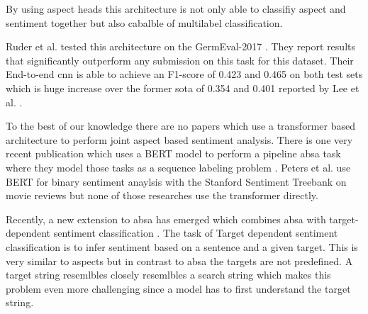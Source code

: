 By using aspect heads this architecture is not only able to classifiy aspect and sentiment together but also cabalble of multilabel classification.

Ruder et al. tested this architecture on the GermEval-2017 \cite{Wojatzki2017}. They report results that significantly outperform any submission on this task for this dataset. Their End-to-end \gls{cnn} is able to achieve an F1-score of 0.423 and 0.465 on both test sets which is huge increase over the former \acrfull{sota} of 0.354 and 0.401 reported by Lee et al. \cite{Lee2017}.
\medskip

To the best of our knowledge there are no papers which use a transformer based architecture to perform joint aspect based sentiment analysis. There is one very recent publication which uses a BERT \cite{Devlin2018} model to perform a pipeline \gls{absa} task where they model those tasks as a sequence labeling problem \cite{Xu2019}. Peters et al. use BERT for binary sentiment anaylsis with the Stanford Sentiment Treebank \cite{Socher2013} on movie reviews \cite{Peters2019} but none of those researches use the transformer directly.
\medskip

Recently, a new extension to \gls{absa} has emerged which combines \gls{absa} with target-dependent sentiment classification \cite{Tang2016}. The task of Target dependent sentiment classification is to infer sentiment based on a sentence and a given target. This is very similar to aspects but in contrast to \gls{absa} the targets are not predefined. A target string resemlbles closely resemlbles a search string which makes this problem even more challenging since a model has to first understand the target string.